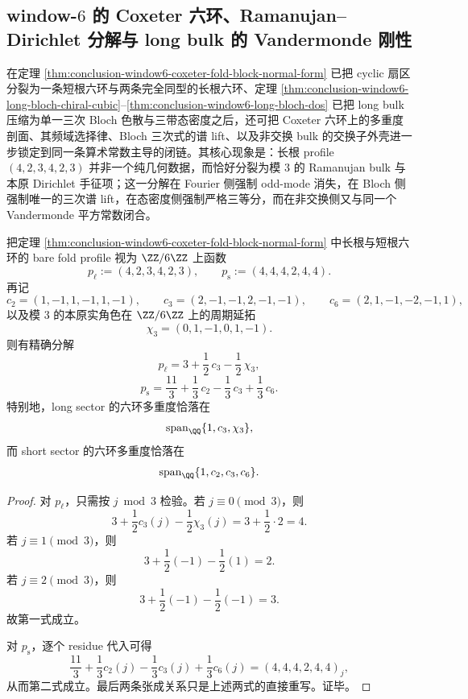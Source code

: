\subsection{window-\texorpdfstring{$6$}{6} 的 Coxeter 六环、Ramanujan--Dirichlet 分解与 long bulk 的 Vandermonde 刚性}\label{subsec:conclusion-window6-coxeter-ramanujan-bloch-vandermonde-laws}
在定理 \ref{thm:conclusion-window6-coxeter-fold-block-normal-form} 已把 cyclic 扇区分裂为一条短根六环与两条完全同型的长根六环、定理 \ref{thm:conclusion-window6-long-bloch-chiral-cubic}--\ref{thm:conclusion-window6-long-bloch-dos} 已把 long bulk 压缩为单一三次 Bloch 色散与三带态密度之后，还可把 Coxeter 六环上的多重度剖面、其频域选择律、Bloch 三次式的谱 lift、以及非交换 bulk 的交换子外壳进一步锁定到同一条算术常数主导的闭链。其核心现象是：长根 profile \((4,2,3,4,2,3)\) 并非一个纯几何数据，而恰好分裂为模 \(3\) 的 Ramanujan bulk 与本原 Dirichlet 手征项；这一分解在 Fourier 侧强制 odd-mode 消失，在 Bloch 侧强制唯一的三次谱 lift，在态密度侧强制严格三等分，而在非交换侧又与同一个 Vandermonde 平方常数闭合。

\begin{theorem}\label{thm:conclusion-window6-coxeter-ramanujan-dirichlet-decomposition}
把定理 \ref{thm:conclusion-window6-coxeter-fold-block-normal-form} 中长根与短根六环的 bare fold profile 视为 \(\ZZ/6\ZZ\) 上函数
\[
p_{\ell}:=(4,2,3,4,2,3),
\qquad
p_{\mathrm{s}}:=(4,4,4,2,4,4).
\]
再记
\[
c_2=(1,-1,1,-1,1,-1),\qquad
c_3=(2,-1,-1,2,-1,-1),\qquad
c_6=(2,1,-1,-2,-1,1),
\]
以及模 \(3\) 的本原实角色在 \(\ZZ/6\ZZ\) 上的周期延拓
\[
\chi_3=(0,1,-1,0,1,-1).
\]
则有精确分解
\[
p_{\ell}=3+\frac12\,c_3-\frac12\,\chi_3,
\]
\[
p_{\mathrm{s}}=\frac{11}{3}+\frac13\,c_2-\frac13\,c_3+\frac13\,c_6.
\]
特别地，long sector 的六环多重度恰落在
\[
\operatorname{span}_{\QQ}\{1,c_3,\chi_3\},
\]
而 short sector 的六环多重度恰落在
\[
\operatorname{span}_{\QQ}\{1,c_2,c_3,c_6\}.
\]
\end{theorem}
\begin{proof}
对 \(p_{\ell}\)，只需按 \(j\bmod 3\) 检验。若 \(j\equiv 0\pmod 3\)，则
\[
3+\frac12 c_3(j)-\frac12\chi_3(j)=3+\frac12\cdot 2=4.
\]
若 \(j\equiv 1\pmod 3\)，则
\[
3+\frac12(-1)-\frac12(1)=2.
\]
若 \(j\equiv 2\pmod 3\)，则
\[
3+\frac12(-1)-\frac12(-1)=3.
\]
故第一式成立。

对 \(p_{\mathrm{s}}\)，逐个 residue 代入可得
\[
\frac{11}{3}+\frac13 c_2(j)-\frac13 c_3(j)+\frac13 c_6(j)
=(4,4,4,2,4,4)_j,
\]
从而第二式成立。最后两条张成关系只是上述两式的直接重写。证毕。
\end{proof}

